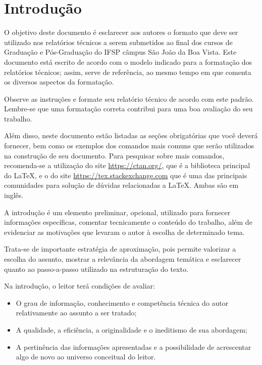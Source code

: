 \chapter{Introdução}
\label{cap:01}

O objetivo deste documento é esclarecer aos autores o formato que deve ser utilizado nos relatórios técnicos a serem submetidos ao final dos cursos de Graduação e Pós-Graduação do IFSP câmpus São João da Boa Vista. Este documento está escrito de acordo com o modelo indicado para a formatação dos relatórios técnicos; assim, serve de referência, ao mesmo tempo em que comenta os diversos aspectos da formatação.

Observe as instruções e formate seu relatório técnico de acordo com este padrão. Lembre-se que uma formatação correta contribui para uma boa avaliação do seu trabalho.

Além disso, neste documento estão listadas as seções obrigatórias que você deverá fornecer, bem como os exemplos dos comandos mais comuns que serão utilizados na construção de seu documento. Para pesquisar sobre mais comandos, recomenda-se a utilização do site \url{https://ctan.org/}, que é a biblioteca principal do \LaTeX, e o do site \url{https://tex.stackexchange.com} que é uma das principais comunidades para solução de dúvidas relacionadas a \LaTeX. Ambas são em inglês.

A introdução é um elemento preliminar, opcional, utilizado para fornecer informações específicas, comentar tecnicamente o conteúdo do trabalho, além de evidenciar as motivações que levaram o autor à escolha de determinado tema.

Trata-se de importante estratégia de aproximação, pois permite valorizar a escolha do assunto, mostrar a relevância da abordagem temática e esclarecer quanto ao passo-a-passo utilizado na estruturação do texto.

Na introdução, o leitor terá condições de avaliar:

\begin{itemize}
	\item O grau de informação, conhecimento e competência técnica do autor relativamente ao assunto a ser tratado;
	\item A qualidade, a eficiência, a originalidade e o ineditismo de sua abordagem;
	\item A pertinência das informações apresentadas e a possibilidade de acrescentar algo de novo ao universo conceitual do leitor.
\end{itemize}


